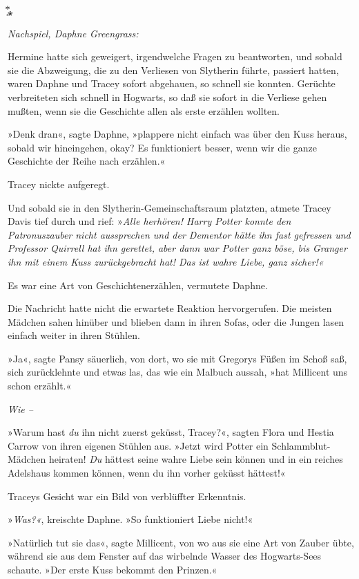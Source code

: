 {͙⃰⁎

\emph{Nachspiel, Daphne Greengrass:}

Hermine hatte sich geweigert, irgendwelche Fragen zu beantworten, und sobald sie die Abzweigung, die zu den Verliesen von Slytherin führte, passiert hatten, waren Daphne und Tracey sofort abgehauen, so schnell sie konnten. Gerüchte verbreiteten sich schnell in Hogwarts, so daß sie sofort in die Verliese gehen mußten, wenn sie die Geschichte allen als erste erzählen wollten.

»Denk dran«, sagte Daphne, »plappere nicht einfach was über den Kuss heraus, sobald wir hineingehen, okay? Es funktioniert besser, wenn wir die ganze Geschichte der Reihe nach erzählen.«

Tracey nickte aufgeregt.

Und sobald sie in den Slytherin-Gemeinschaftsraum platzten, atmete Tracey Davis tief durch und rief: »\emph{Alle herhören! Harry Potter konnte den Patronuszauber nicht aussprechen und der Dementor hätte ihn fast gefressen und Professor Quirrell hat ihn gerettet, aber dann war Potter ganz böse, bis Granger ihn mit einem Kuss zurückgebracht hat! Das ist wahre Liebe, ganz sicher!«}

Es war eine Art von Geschichtenerzählen, vermutete Daphne.

Die Nachricht hatte nicht die erwartete Reaktion hervorgerufen. Die meisten Mädchen sahen hinüber und blieben dann in ihren Sofas, oder die Jungen lasen einfach weiter in ihren Stühlen.

»Ja«, sagte Pansy säuerlich, von dort, wo sie mit Gregorys Füßen im Schoß saß, sich zurücklehnte und etwas las, das wie ein Malbuch aussah, »hat Millicent uns schon erzählt.«

\emph{Wie --}

»Warum hast \emph{du} ihn nicht zuerst geküsst, Tracey?«, sagten Flora und Hestia Carrow von ihren eigenen Stühlen aus. »Jetzt wird Potter ein Schlammblut-Mädchen heiraten! \emph{Du} hättest seine wahre Liebe sein können und in ein reiches Adelshaus kommen können, wenn du ihn vorher geküsst hättest!«

Traceys Gesicht war ein Bild von verblüffter Erkenntnis.

»\emph{Was?«}, kreischte Daphne. »So funktioniert Liebe nicht!«

»Natürlich tut sie das«, sagte Millicent, von wo aus sie eine Art von Zauber übte, während sie aus dem Fenster auf das wirbelnde Wasser des Hogwarts-Sees schaute. »Der erste Kuss bekommt den Prinzen.«

}

